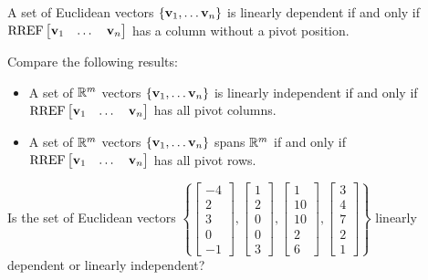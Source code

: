 \begin{fact}
  A set of Euclidean vectors
  \(\{\mathbf v_1,\dots\mathbf v_n\}\) is linearly dependent if and only
  if \(\operatorname{RREF}\begin{bmatrix}\mathbf v_1&\dots&\mathbf v_n\end{bmatrix}\)
  has a column without a pivot position.
\end{fact}


\begin{observation}
  Compare the following results:
  
  \begin{itemize}
  \item A set of \(\mathbb{R}^m\) vectors
  \(\{\mathbf v_1,\dots\mathbf v_n\}\) is linearly independent if and only
  if \(\operatorname{RREF}\begin{bmatrix}\mathbf v_1&\dots&\mathbf v_n\end{bmatrix}\)
  has all pivot columns.
  \item A set of \(\mathbb{R}^m\) vectors
  \(\{\mathbf v_1,\dots\mathbf v_n\}\) spans \(\mathbb{R}^m\) if and only
  if \(\operatorname{RREF}\begin{bmatrix}\mathbf v_1&\dots&\mathbf v_n\end{bmatrix}\)
  has all pivot rows.
  \end{itemize}
\end{observation}

\begin{activity}{5}
  Is the set of Euclidean vectors \(\left\{
  \begin{bmatrix}-4\\2\\3\\0\\-1\end{bmatrix},
  \begin{bmatrix}1\\2\\0\\0\\3\end{bmatrix},
  \begin{bmatrix}1\\10\\10\\2\\6\end{bmatrix},
  \begin{bmatrix}3\\4\\7\\2\\1\end{bmatrix}
  \right\}\) linearly dependent or linearly independent?
\end{activity}

